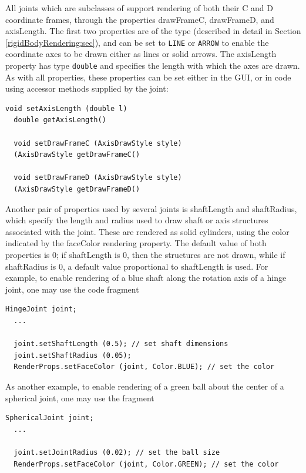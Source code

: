 All joints which are subclasses of
 support rendering of
both their C and D coordinate frames, through the properties {\sf
drawFrameC}, {\sf drawFrameD}, and {\sf axisLength}.  The first two
properties are of the type
 (described
in detail in Section \ref{rigidBodyRendering:sec}), and can be set to
{\tt LINE} or {\tt ARROW} to enable the coordinate axes to be drawn
either as lines or solid arrows. The {\sf axisLength} property has
type {\tt double} and specifies the length with which the axes are
drawn. As with all properties, these properties can be set either in
the GUI, or in code using accessor methods supplied by the joint:
%
\begin{lstlisting}[]
  void setAxisLength (double l)
  double getAxisLength()

  void setDrawFrameC (AxisDrawStyle style)
  (AxisDrawStyle getDrawFrameC()

  void setDrawFrameD (AxisDrawStyle style)
  (AxisDrawStyle getDrawFrameD()
\end{lstlisting}
%

Another pair of properties used by several joints is {\sf shaftLength}
and {\sf shaftRadius}, which specify the length and radius used to
draw shaft or axis structures associated with the joint.  These are
rendered as solid cylinders, using the color indicated by the {\sf
faceColor} rendering property.  The default value of both properties
is 0; if {\sf shaftLength} is 0, then the structures are not drawn,
while if {\sf shaftRadius} is 0, a default value proportional to {\sf
shaftLength} is used. For example, to enable rendering of a blue shaft
along the rotation axis of a hinge joint, one may use the code
fragment
%
\begin{lstlisting}[]
  HingeJoint joint;
  ...

  joint.setShaftLength (0.5); // set shaft dimensions
  joint.setShaftRadius (0.05);
  RenderProps.setFaceColor (joint, Color.BLUE); // set the color
\end{lstlisting}
%
As another example, to enable rendering of a green ball about the
center of a spherical joint, one may use the fragment
%
\begin{lstlisting}[]
  SphericalJoint joint;
  ...

  joint.setJointRadius (0.02); // set the ball size
  RenderProps.setFaceColor (joint, Color.GREEN); // set the color
\end{lstlisting}
%

